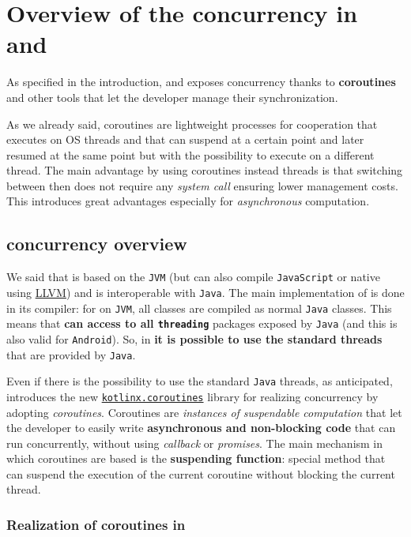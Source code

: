 \section{Overview of the concurrency in \Kotlin and \Go}

As specified in the introduction, \Kotlin and \Go exposes concurrency thanks to \textbf{coroutines} and other tools that let the developer manage their synchronization.

As we already said, coroutines are lightweight processes for cooperation that executes on OS threads and that can suspend at a certain point and later resumed at the same point but with the possibility to execute on a different thread. The main advantage by using coroutines instead threads is that switching between then does not require any \textit{system call} ensuring lower management costs.
This introduces great advantages especially for \textit{asynchronous} computation.

\subsection{\Kotlin concurrency overview}

We said that \Kotlin is based on the \texttt{JVM} (but can also compile \texttt{JavaScript} or native using \href{https://llvm.org/}{LLVM}) and is interoperable with \texttt{Java}. The main implementation of \Kotlin is done in its compiler: for \Kotlin on \texttt{JVM}, all classes are compiled as normal \texttt{Java} classes. This means that \textbf{\Kotlin can access to all \texttt{threading}} packages exposed by \texttt{Java} (and this is also valid for \texttt{Android}). So, in \Kotlin \textbf{it is possible to use the standard threads} that are provided by \texttt{Java}.

Even if there is the possibility to use the standard \texttt{Java} threads, as anticipated, \Kotlin introduces the new \href{https://github.com/Kotlin/kotlinx.coroutines}{\texttt{kotlinx.coroutines}} library for realizing concurrency by adopting \textit{coroutines}. Coroutines are \textit{instances of suspendable computation} that let the developer to easily write \textbf{asynchronous and non-blocking code} that can run concurrently, without using \textit{callback} or \textit{promises}.
The main mechanism in which \Kotlin coroutines are based is the \textbf{suspending function}: special \Kotlin method that can suspend the execution of the current coroutine without blocking the current thread.

\subsubsection{Realization of coroutines in \Kotlin}

